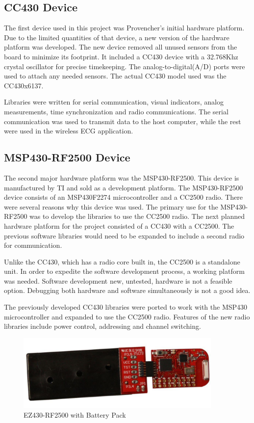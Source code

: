 \documentclass{article}
\begin{document}
\subsection{CC430 Device}
The first device used in this project was Provencher's initial hardware platform. Due to the limited quantities of that device, a new version of the hardware platform was developed. The new device removed all unused sensors from the board to minimize its footprint. It included a CC430 device with a 32.768Khz crystal oscillator for precise timekeeping. The analog-to-digital(A/D) ports were used to attach any needed sensors. The actual CC430 model used was the CC430x6137.

Libraries were written for serial communication, visual indicators, analog measurements, time synchronization and radio communications. The serial communication was used to transmit data to the host computer, while the rest were used in the wireless ECG application.

\subsection{MSP430-RF2500 Device}
The second major hardware platform was the MSP430-RF2500. This device is manufactured by TI and sold as a development platform. The MSP430-RF2500 device consists of an MSP430F2274 microcontroller and a CC2500 radio. There were several reasons why this device was used. The primary use for the MSP430-RF2500 was to develop the libraries to use the CC2500 radio. The next planned hardware platform for the project consisted of a CC430 with a CC2500. The previous software libraries would need to be expanded to include a second radio for communication.

Unlike the CC430, which has a radio core built in, the CC2500 is a standalone unit. In order to expedite the software development process, a working platform was needed. Software development new, untested, hardware is not a feasible option. Debugging both hardware and software simultaneously is not a good idea.

The previously developed CC430 libraries were ported to work with the MSP430 microcontroller and expanded to use the CC2500 radio. Features of the new radio libraries include power control, addressing and channel switching.

\begin{figure}[htb]
\begin{center}
\includegraphics[width=0.9\textwidth]{figures/ez430-rf2500.pdf}
\end{center}
\caption{EZ430-RF2500 with Battery Pack}
\label{fig:ez430}
\end{figure}
\end{document}
